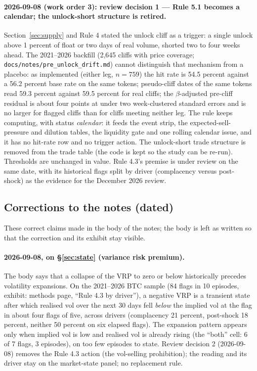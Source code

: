 \documentclass[11pt,a4paper]{article}
\theoremstyle{definition}
\begin{document}
\paragraph{2026-09-08 (work order 3): review decision 1 --- Rule 5.1 becomes a calendar; the unlock-short structure is retired.} Section~\ref{sec:supply} and Rule 4 stated the unlock cliff as a trigger: a single unlock above 1 percent of float or two days of real volume, shorted two to four weeks ahead. The 2021--2026 backfill (2,645 cliffs with price coverage; \texttt{docs/notes/pre\_unlock\_drift.md}) cannot distinguish that mechanism from a placebo: as implemented (either leg, $n=759$) the hit rate is 54.5 percent against a 56.2 percent base rate on the same tokens; pseudo-cliff dates of the same tokens read 59.3 percent against 59.5 percent for real cliffs; the $\beta$-adjusted pre-cliff residual is about four points at under two week-clustered standard errors and is no larger for flagged cliffs than for cliffs meeting neither leg. The rule keeps computing, with status \emph{calendar}: it feeds the event strip, the expected-sell-pressure and dilution tables, the liquidity gate and one rolling calendar issue, and it has no hit-rate row and no trigger action. The unlock-short trade structure is removed from the trade table (the code is kept so the study can be re-run). Thresholds are unchanged in value. Rule 4.3's premise is under review on the same date, with its historical flags split by driver (complacency versus post-shock) as the evidence for the December 2026 review.

\subsection{Corrections to the notes (dated)}\label{sec:impl-corrections}

These correct claims made in the body of the notes; the body is left as written so that the correction and its exhibit stay visible.

\paragraph{2026-09-08, on \S\ref{sec:state} (variance risk premium).} The body says that a collapse of the VRP to zero or below historically precedes volatility expansions. On the 2021--2026 BTC sample (84 flags in 10 episodes, exhibit: methods page, ``Rule 4.3 by driver''), a negative VRP is a transient state after which realised vol over the next 30 days fell \emph{below} the implied vol at the flag in about four flags of five, across drivers (complacency 21 percent, post-shock 18 percent, neither 50 percent on six elapsed flags). The expansion pattern appears only when implied vol is low and realised vol is already rising (the ``both'' cell: 6 of 7 flags, 3 episodes), on too few episodes to state. Review decision 2 (2026-09-08) removes the Rule 4.3 action (the vol-selling prohibition); the reading and its driver stay on the market-state panel; no replacement rule.
\end{document}
